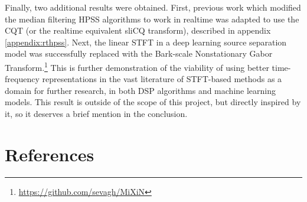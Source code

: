 \documentclass[letter,12pt]{article}
\begin{document}
Finally, two additional results were obtained. First, previous work which modified the median filtering HPSS algorithms \cite{fitzgerald1, driedger} to work in realtime was adapted to use the CQT (or the realtime equivalent sliCQ transform), described in appendix \ref{appendix:rthpss}. Next, the linear STFT in a deep learning source separation model was successfully replaced with the Bark-scale Nonstationary Gabor Transform.\footnote{\url{https://github.com/sevagh/MiXiN}} This is further demonstration of the viability of using better time-frequency representations in the vast literature of STFT-based methods as a domain for further research, in both DSP algorithms and machine learning models. This result is outside of the scope of this project, but directly inspired by it, so it deserves a brief mention in the conclusion.

\vfill
\clearpage %

\section{References}
\printbibliography[heading=none]

\vfill
\clearpage %
\end{document}
